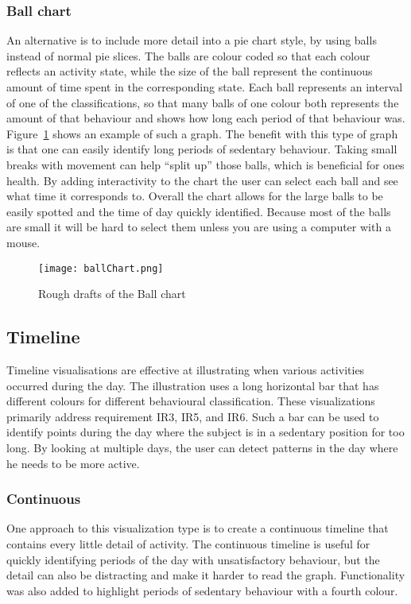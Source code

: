 \subsubsection{Ball chart}
An alternative is to include more detail into a pie chart style, by using balls instead of normal pie slices. The balls are colour coded so that each colour reflects an activity state, while the size of the ball represent the continuous amount of time spent in the corresponding state. Each ball represents an interval of one of the classifications, so that many balls of one colour both represents the amount of that behaviour and shows how long each period of that behaviour was. Figure~\ref{fig:ballChart} shows an example of such a graph. The benefit with this type of graph is that one can easily identify long periods of sedentary behaviour. Taking small breaks with movement can help ``split up'' those balls, which is beneficial for ones health. By adding interactivity to the chart the user can select each ball and see what time it corresponds to. Overall the chart allows for the large balls to be easily spotted and the time of day quickly identified. Because most of the balls are small it will be hard to select them unless you are using a computer with a mouse.

\begin{figure}[h!]
	\centering
		\texttt{[image: ballChart.png]}
		\caption{\footnotesize Rough drafts of the Ball chart}
		\label{fig:ballChart}
\end{figure}

\subsection{Timeline}
Timeline visualisations are effective at illustrating when various activities occurred during the day. The illustration uses a long horizontal bar that has different colours for different behavioural classification. These visualizations primarily address requirement IR3, IR5, and IR6. Such a bar can be used to identify points during the day where the subject is in a sedentary position for too long. By looking at multiple days, the user can detect patterns in the day where he needs to be more active.

\subsubsection{Continuous}
One approach to this visualization type is to create a continuous timeline that contains every little detail of activity. The continuous timeline is useful for quickly identifying periods of the day with unsatisfactory behaviour, but the detail can also be distracting and make it harder to read the graph. Functionality was also added to highlight periods of sedentary behaviour with a fourth colour. 

